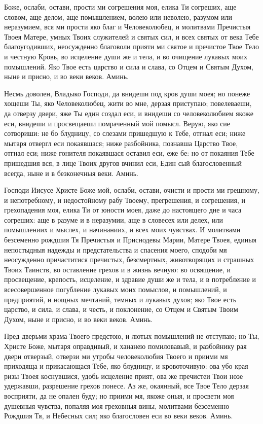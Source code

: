 \begin{mymulticols}

Боже, ослаби, остави, прости ми согрешения моя, елика Ти согреших, аще словом, аще делом, аще помышлением, волею или неволею, разумом или неразумием, вся ми прости яко благ и Человеколюбец, и молитвами Пречистыя Твоея Матере, умных Твоих служителей и святых сил, и всех святых от века Тебе благоугодивших, неосужденно благоволи прияти ми святое и пречистое Твое Тело и честную Кровь, во исцеление души же и тела, и во очищение лукавых моих помышлений. Яко Твое есть царство и сила и слава, со Отцем и Святым Духом, ныне и присно, и во веки веков. Аминь.


Несмь доволен, Владыко Господи, да внидеши под кров души моея; но понеже хощеши Ты, яко Человеколюбец, жити во мне, дерзая приступаю; повелеваеши, да отверзу двери, яже Ты един создал еси, и внидеши со человеколюбием якоже еси, внидеши и просвещаеши помраченный мой помысл. Верую, яко сие сотвориши: не бо блудницу, со слезами пришедшую к Тебе, отгнал еси; ниже мытаря отвергл еси покаявшася; ниже разбойника, познавша Царство Твое, отгнал еси; ниже гонителя покаявшася оставил еси, еже бе: но от покаяния Тебе пришедшия вся, в лице Твоих другов вчинил еси, Един сый благословенный всегда, ныне и в безконечныя веки. Аминь.


Господи Иисусе Христе Боже мой, ослаби, остави, очисти и прости ми грешному, и непотребному, и недостойному рабу Твоему, прегрешения, и согрешения, и грехопадения моя, елика Ти от юности моея, даже до настоящего дне и часа согреших: аще в разуме и в неразумии, аще в словесех или делех, или помышлениих и мыслех, и начинаниих, и всех моих чувствах. И молитвами безсеменно рождшия Тя Пречистыя и Приснодевы Марии, Матере Твоея, единыя непостыдныя надежды и предстательства и спасения моего, сподоби мя неосужденно причаститися пречистых, безсмертных, животворящих и страшных Твоих Таинств, во оставление грехов и в жизнь вечную: во освящение, и просвещение, крепость, исцеление, и здравие души же и тела, и в потребление и всесовершенное погубление лукавых моих помыслов, и помышлений, и предприятий, и нощных мечтаний, темных и лукавых духов; яко Твое есть царство, и сила, и слава, и честь, и поклонение, со Отцем и Святым Твоим Духом, ныне и присно, и во веки веков. Аминь.


Пред дверьми храма Твоего предстою, и лютых помышлений не отступаю; но Ты, Христе Боже, мытаря оправдивый, и хананею помиловавый, и разбойнику рая двери отверзый, отверзи ми утробы человеколюбия Твоего и приими мя приходяща и прикасающася Тебе, яко блудницу, и кровоточивую: ова убо края ризы Твоея коснувшися, удобь исцеление прият, ова же пречистеи Твои нозе удержавши, разрешение грехов понесе. Аз же, окаянный, все Твое Тело дерзая восприяти, да не опален буду; но приими мя, якоже оныя, и просвети моя душевныя чувства, попаляя моя греховныя вины, молитвами безсеменно Рождшия Тя, и Небесных сил; яко благословен еси во веки веков. Аминь.


\end{mymulticols}
